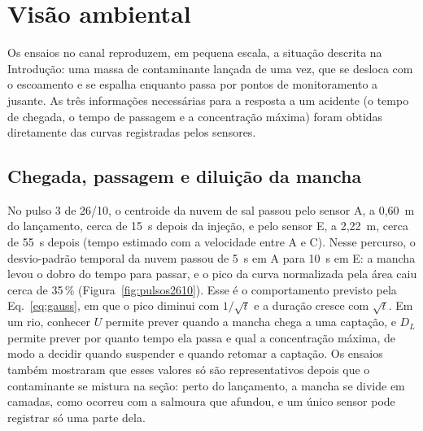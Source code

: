 \documentclass[12pt,a4paper]{article}
\begin{document}
\section{Visão ambiental}
\label{sec:visao_ambiental}

Os ensaios no canal reproduzem, em pequena escala, a situação descrita na Introdução: uma massa de contaminante lançada de uma vez, que se desloca com o escoamento e se espalha enquanto passa por pontos de monitoramento a jusante. As três informações necessárias para a resposta a um acidente (o tempo de chegada, o tempo de passagem e a concentração máxima) foram obtidas diretamente das curvas registradas pelos sensores.

\subsection{Chegada, passagem e diluição da mancha}
No pulso 3 de 26/10, o centroide da nuvem de sal passou pelo sensor A, a 0,60~m do lançamento, cerca de 15~s depois da injeção, e pelo sensor E, a 2,22~m, cerca de 55~s depois (tempo estimado com a velocidade entre A e C). Nesse percurso, o desvio-padrão temporal da nuvem passou de 5~s em A para 10~s em E: a mancha levou o dobro do tempo para passar, e o pico da curva normalizada pela área caiu cerca de 35\,\% (Figura~\ref{fig:pulsos2610}). Esse é o comportamento previsto pela Eq.~\eqref{eq:gauss}, em que o pico diminui com $1/\sqrt{t}$ e a duração cresce com $\sqrt{t}$. Em um rio, conhecer $U$ permite prever quando a mancha chega a uma captação, e $D_L$ permite prever por quanto tempo ela passa e qual a concentração máxima, de modo a decidir quando suspender e quando retomar a captação. Os ensaios também mostraram que esses valores só são representativos depois que o contaminante se mistura na seção: perto do lançamento, a mancha se divide em camadas, como ocorreu com a salmoura que afundou, e um único sensor pode registrar só uma parte dela.
\end{document}
